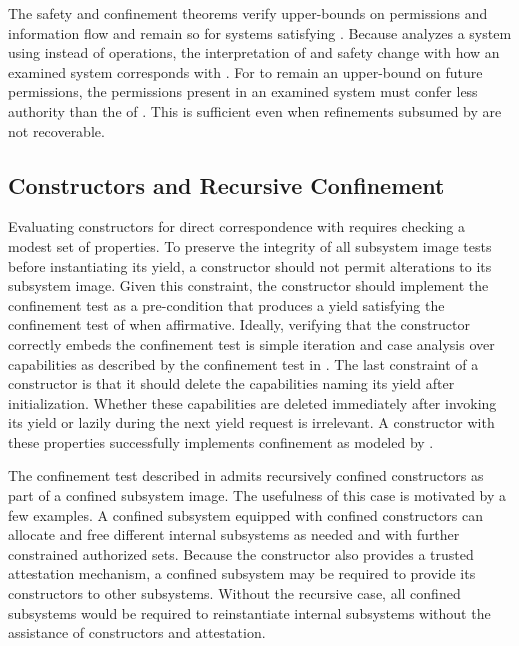 The safety and confinement theorems verify upper-bounds on permissions and information flow and remain so for systems satisfying \TMmodelName{}.
Because \COQpotAcc{} analyzes a system using \TMaccessRights{} instead of operations, the interpretation of \TMpotAcc{} and safety change with how an examined system corresponds with \TMmodelName{}.
For \TMpotAcc{} to remain an upper-bound on future permissions, the permissions present in an examined system must confer less authority than the \TMaccessRights{} of \TMmodelName{}.
This is sufficient even when refinements subsumed by \TMaccessRights{} are not recoverable.

\subsection{Constructors and Recursive Confinement}
\label{sect:corr:constructor}

Evaluating constructors for direct correspondence with \TMmodelName{} requires checking a modest set of properties.
To preserve the integrity of all subsystem image tests before instantiating its yield, a constructor should not permit alterations to its subsystem image.
Given this constraint, the constructor should implement the confinement test as a pre-condition that produces a yield satisfying the confinement test of \TMmodelName{} when affirmative.
Ideally, verifying that the constructor correctly embeds the confinement test is simple iteration and case analysis over capabilities as described by the confinement test in \TMmodelName{}.
The last constraint of a constructor is that it should delete the capabilities naming its yield after initialization.
Whether these capabilities are deleted immediately after invoking its yield or lazily during the next yield request is irrelevant.
A constructor with these properties successfully implements confinement as modeled by \TMmodelName{}.

The confinement test described in  admits recursively confined constructors as part of a confined subsystem image.
The usefulness of this case is motivated by a few examples.
A confined subsystem equipped with confined constructors can allocate and free different internal subsystems as needed and with further constrained authorized sets.
Because the constructor also provides a trusted attestation mechanism, a confined subsystem may be required to provide its constructors to other subsystems.
Without the recursive case, all confined subsystems would be required to reinstantiate internal subsystems without the assistance of constructors and attestation.

